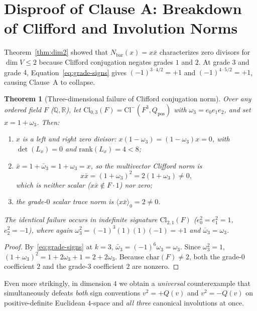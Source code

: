 \documentclass[11pt]{article}
\newtheorem{theorem}{Theorem}[section]
\theoremstyle{definition}
\newcommand{\Cl}{\mathrm{Cl}}
\newcommand{\Nbar}{N_{\mathrm{bar}}}
\begin{document}
\section{Disproof of Clause A: Breakdown of Clifford and Involution Norms}

Theorem~\ref{thm:dim2} showed that $\Nbar(x) = x\bar{x}$ characterizes zero
divisors for $\dim V \le 2$ because Clifford conjugation negates grades $1$ and $2$.
At grade $3$ and grade $4$, Equation~\eqref{eq:grade-signs} gives
$(-1)^{3\cdot 4/2} = +1$ and $(-1)^{4\cdot 5/2} = +1$, causing Clause~A to collapse.

\begin{theorem}[Three-dimensional failure of Clifford conjugation norm]
\label{thm:dim3-norm}
Over any ordered field $F$ ($\mathbb{Q}, \mathbb{R}$), let
$\Cl_{0,3}(F) = \Cl^-(F^3, Q_{\mathrm{pos}})$ with $\omega_3 = e_0 e_1 e_2$, and
set $x = 1 + \omega_3$. Then:
\begin{enumerate}
  \item $x$ is a left and right zero divisor: $x(1 - \omega_3) = (1 - \omega_3)x = 0$,
    with $\det(L_x) = 0$ and $\mathrm{rank}(L_x) = 4 < 8$;
  \item $\bar{x} = 1 + \bar{\omega}_3 = 1 + \omega_3 = x$, so the multivector
    Clifford norm is
    \[
      x\bar{x} = (1 + \omega_3)^2 = 2(1 + \omega_3) \neq 0,
    \]
    which is neither scalar ($x\bar{x} \notin F\cdot 1$) nor zero;
  \item the grade-$0$ scalar trace norm is $\langle x\bar{x}\rangle_0 = 2 \neq 0$.
\end{enumerate}
The identical failure occurs in indefinite signature $\Cl_{2,1}(F)$ ($e_0^2 = e_1^2 = 1$,
$e_2^2 = -1$), where again $\omega_3^2 = (-1)^3(1)(1)(-1) = +1$ and $\bar{\omega}_3 = \omega_3$.
\end{theorem}
\begin{proof}
By~\eqref{eq:grade-signs} at $k = 3$, $\bar{\omega}_3 = (-1)^6 \omega_3 = \omega_3$.
Since $\omega_3^2 = 1$, $(1 + \omega_3)^2 = 1 + 2\omega_3 + 1 = 2 + 2\omega_3$.
Because $\mathrm{char}(F) \neq 2$, both the grade-$0$ coefficient $2$ and the
grade-$3$ coefficient $2$ are nonzero.
\end{proof}

Even more strikingly, in dimension $4$ we obtain a \emph{universal} counterexample
that simultaneously defeats \emph{both} sign conventions $v^2 = +Q(v)$ and
$v^2 = -Q(v)$ on positive-definite Euclidean $4$-space and \emph{all three}
canonical involutions at once.
\end{document}
